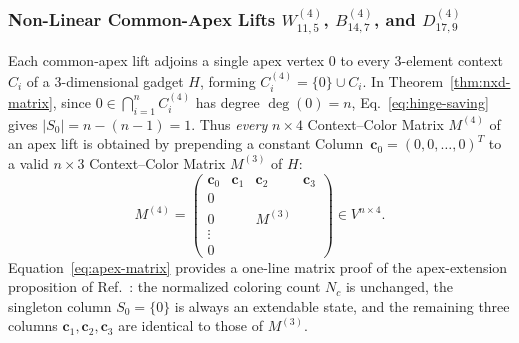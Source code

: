 \documentclass[aps,pra,reprint,superscriptaddress,longbibliography,nofootinbib,floatfix,10pt]{revtex4-2}
\theoremstyle{definition}\newtheorem{definition}[theorem]{Definition}
\theoremstyle{remark}\newtheorem{remark}[theorem]{Remark}
\begin{document}
\subsubsection{Non-Linear Common-Apex Lifts \texorpdfstring{$W_{11,5}^{(4)}$, $B_{14,7}^{(4)}$, and $D_{17,9}^{(4)}$}{W11,5(4), B14,7(4), and D17,9(4)}}
Each common-apex lift adjoins a single apex vertex $0$ to every $3$-element context $C_i$ of a $3$-dimensional gadget $H$, forming $C_i^{(4)}=\{0\}\cup C_i$. In Theorem~\ref{thm:nxd-matrix}, since $0\in\bigcap_{i=1}^n C_i^{(4)}$ has degree $\deg(0)=n$, Eq.~\eqref{eq:hinge-saving} gives $|S_0|=n-(n-1)=1$. Thus \emph{every} $n\times 4$ Context--Color Matrix $M^{(4)}$ of an apex lift is obtained by prepending a constant Column~$\mathbf{c}_0=(0,0,\ldots,0)^T$ to a valid $n\times 3$ Context--Color Matrix $M^{(3)}$ of $H$:
\begin{equation}\label{eq:apex-matrix}
M^{(4)}=\left(\begin{array}{c|ccc}
\mathbf{c}_0 & \mathbf{c}_1 & \mathbf{c}_2 & \mathbf{c}_3\\\hline
0 & & & \\
0 & & M^{(3)} & \\
\vdots & & & \\
0 & & &
\end{array}\right)\in V^{n\times 4}.
\end{equation}
Equation~\eqref{eq:apex-matrix} provides a one-line matrix proof of the apex-extension proposition of Ref.~\cite{svozil2026contexts}: the normalized coloring count $N_c$ is unchanged, the singleton column $S_0=\{0\}$ is always an extendable state, and the remaining three columns $\mathbf{c}_1,\mathbf{c}_2,\mathbf{c}_3$ are identical to those of $M^{(3)}$.
\end{document}
